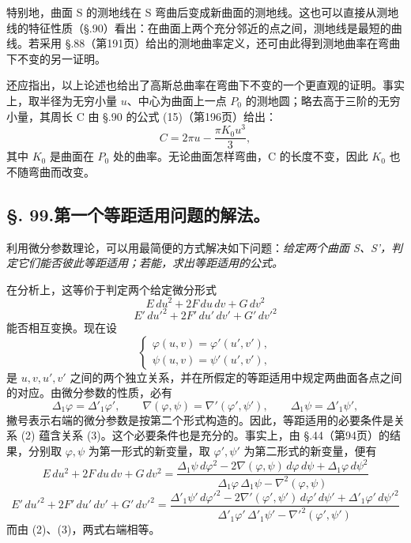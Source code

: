 特别地，曲面 S 的测地线在 S 弯曲后变成新曲面的测地线。这也可以直接从测地线的特征性质（\S.90）看出：在曲面上两个充分邻近的点之间，测地线是最短的曲线。若采用 \S.88（第191页）给出的测地曲率定义，还可由此得到测地曲率在弯曲下不变的另一证明。

还应指出，以上论述也给出了高斯总曲率在弯曲下不变的一个更直观的证明。事实上，取半径为无穷小量 \(u\)、中心为曲面上一点 \(P_0\) 的测地圆；略去高于三阶的无穷小量，其周长 C 由 \S.90 的公式 (15)（第196页）给出：
\[
 C=2\pi u-\frac{\pi K_0u^3}{3},
\]
其中 \(K_0\) 是曲面在 \(P_0\) 处的曲率。无论曲面怎样弯曲，C 的长度不变，因此 \(K_0\) 也不随弯曲而改变。

\subsection*{\S. 99.\quad 第一个等距适用问题的解法。}

利用微分参数理论，可以用最简便的方式解决如下问题：\emph{给定两个曲面 S、S'，判定它们能否彼此等距适用；若能，求出等距适用的公式。}

在分析上，这等价于判定两个给定微分形式
\[
 E\,du^2+2F\,du\,dv+G\,dv^2
\]
\[
 E'\,du'^2+2F'\,du'\,dv'+G'\,dv'^2
\]
能否相互变换。现在设
\begin{equation}\tag{2}
 \begin{cases}
 \varphi(u,v)=\varphi'(u',v'),\\
 \psi(u,v)=\psi'(u',v'),
 \end{cases}
\end{equation}
是 \(u,v,u',v'\) 之间的两个独立关系，并在所假定的等距适用中规定两曲面各点之间的对应。由微分参数的性质，必有
\begin{equation}\tag{3}
 \Delta_1\varphi=\Delta'_1\varphi',
 \qquad
 \nabla(\varphi,\psi)=\nabla'(\varphi',\psi'),
 \qquad
 \Delta_1\psi=\Delta'_1\psi',
\end{equation}
撇号表示右端的微分参数是按第二个形式构造的。因此，等距适用的必要条件是关系 (2) 蕴含关系 (3)。这个必要条件也是充分的。事实上，由 \S.44（第94页）的结果，分别取 \(\varphi,\psi\) 为第一形式的新变量，取 \(\varphi',\psi'\) 为第二形式的新变量，便有
\[
 E\,du^2+2F\,du\,dv+G\,dv^2=
 \frac{\Delta_1\psi\,d\varphi^2-2\nabla(\varphi,\psi)\,d\varphi\,d\psi+\Delta_1\varphi\,d\psi^2}{\Delta_1\varphi\,\Delta_1\psi-\nabla^2(\varphi,\psi)}
\]
\[
 E'\,du'^2+2F'\,du'\,dv'+G'\,dv'^2=
 \frac{\Delta'_1\psi'\,d\varphi'^2-2\nabla'(\varphi',\psi')\,d\varphi'\,d\psi'+\Delta'_1\varphi'\,d\psi'^2}{\Delta'_1\varphi'\,\Delta'_1\psi'-\nabla'^2(\varphi',\psi')}
\]
而由 (2)、(3)，两式右端相等。

